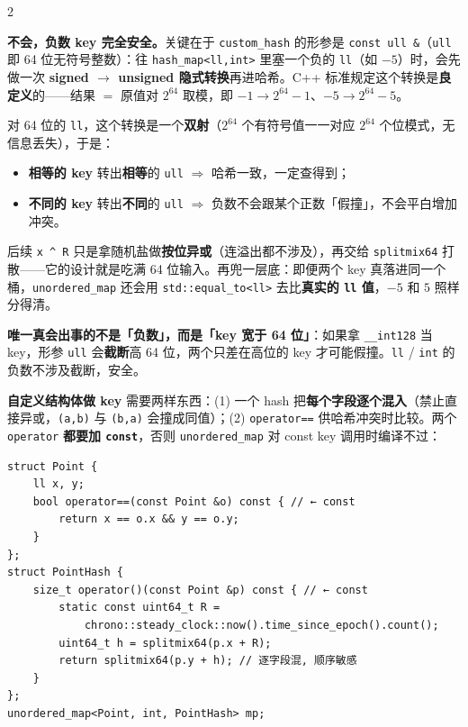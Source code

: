 \begin{multicols*}{2}
		\begin{mentor}
\textbf{不会，负数 key 完全安全。}关键在于 \texttt{custom\_hash} 的形参是 \texttt{const ull \&}（\texttt{ull} 即 64 位无符号整数）：往 \texttt{hash\_map<ll,int>} 里塞一个负的 \texttt{ll}（如 \(-5\)）时，会先做一次 \textbf{signed \(\to\) unsigned 隐式转换}再进哈希。C++ 标准规定这个转换是\textbf{良定义}的——结果 \(=\) 原值对 \(2^{64}\) 取模，即 \(-1 \to 2^{64}-1\)、\(-5 \to 2^{64}-5\)。

对 64 位的 \texttt{ll}，这个转换是一个\textbf{双射}（\(2^{64}\) 个有符号值一一对应 \(2^{64}\) 个位模式，无信息丢失），于是：

\begin{itemize}
  \item \textbf{相等的 key} 转出\textbf{相等}的 \texttt{ull} \(\Rightarrow\) 哈希一致，一定查得到；
  \item \textbf{不同的 key} 转出\textbf{不同}的 \texttt{ull} \(\Rightarrow\) 负数不会跟某个正数「假撞」，不会平白增加冲突。
\end{itemize}

后续 \texttt{x \^{} R} 只是拿随机盐做\textbf{按位异或}（连溢出都不涉及），再交给 \texttt{splitmix64} 打散——它的设计就是吃满 64 位输入。再兜一层底：即便两个 key 真落进同一个桶，\texttt{unordered\_map} 还会用 \texttt{std::equal\_to<ll>} 去比\textbf{真实的 \texttt{ll} 值}，\(-5\) 和 \(5\) 照样分得清。

\textbf{唯一真会出事的不是「负数」，而是「key 宽于 64 位」}：如果拿 \texttt{\_\_int128} 当 key，形参 \texttt{ull} 会\textbf{截断}高 64 位，两个只差在高位的 key 才可能假撞。\texttt{ll} / \texttt{int} 的负数不涉及截断，安全。
		\end{mentor}

		\textbf{自定义结构体做 key} 需要两样东西：(1) 一个 hash 把\textbf{每个字段逐个混入}（禁止直接异或，\texttt{(a,b)} 与 \texttt{(b,a)} 会撞成同值）；(2) \texttt{operator==} 供哈希冲突时比较。两个 \texttt{operator} \textbf{都要加 \texttt{const}}，否则 \texttt{unordered\_map} 对 const key 调用时编译不过：

		\begin{verbatim}
struct Point {
	ll x, y;
	bool operator==(const Point &o) const { // ← const
		return x == o.x && y == o.y;
	}
};
struct PointHash {
	size_t operator()(const Point &p) const { // ← const
		static const uint64_t R =
			chrono::steady_clock::now().time_since_epoch().count();
		uint64_t h = splitmix64(p.x + R);
		return splitmix64(p.y + h); // 逐字段混, 顺序敏感
	}
};
unordered_map<Point, int, PointHash> mp;
		\end{verbatim}


\end{multicols*}
